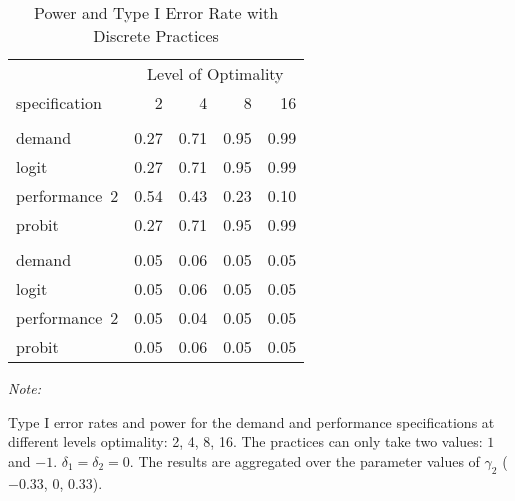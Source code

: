 \begin{table}

\caption{\label{tab:discrete-table}Power and Type I Error Rate with Discrete Practices}
\centering
\fontsize{9}{11}\selectfont
\begin{threeparttable}
\begin{tabular}[t]{lrrrr}
\toprule
\multicolumn{1}{c}{ } & \multicolumn{4}{c}{Level of Optimality} \\
\cmidrule(l{3pt}r{3pt}){2-5}
specification & 2 & 4 & 8 & 16\\
\midrule
\addlinespace[0.3em]
\multicolumn{5}{c}{\textbf{Power}}\\
\hspace{1em}demand & 0.27 & 0.71 & 0.95 & 0.99\\
\hspace{1em}logit & 0.27 & 0.71 & 0.95 & 0.99\\
\hspace{1em}performance~2 & 0.54 & 0.43 & 0.23 & 0.10\\
\hspace{1em}probit & 0.27 & 0.71 & 0.95 & 0.99\\
\addlinespace[0.3em]
\multicolumn{5}{c}{\textbf{Type I}}\\
\hspace{1em}demand & 0.05 & 0.06 & 0.05 & 0.05\\
\hspace{1em}logit & 0.05 & 0.06 & 0.05 & 0.05\\
\hspace{1em}performance~2 & 0.05 & 0.04 & 0.05 & 0.05\\
\hspace{1em}probit & 0.05 & 0.06 & 0.05 & 0.05\\
\bottomrule
\end{tabular}
\begin{tablenotes}
\item \textit{Note: } 
\item Type I error rates and power for the demand and 
  performance specifications at different levels optimality: 2,
  4, 8, 16. The practices can only take two values: $1$ and $-1$.
  $\delta_1 = \delta_2 = 0$. The results are aggregated over
  the parameter values of $\gamma_2$ ($-0.33$, $0$, $0.33$).
\end{tablenotes}
\end{threeparttable}
\end{table}